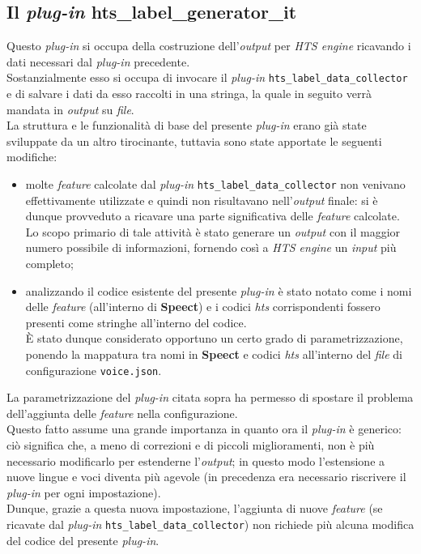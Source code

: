      \subsection{Il \textit{plug-in} hts\_label\_generator\_it}
		 Questo \textit{plug-in} si occupa della costruzione dell'\textit{output} per \textit{HTS engine} ricavando i dati
		 necessari  dal \textit{plug-in} precedente. \\ Sostanzialmente esso si occupa di invocare il \textit{plug-in}
		 \texttt{hts\_label\_data\_collector} e di salvare i dati da esso raccolti in una stringa, la quale 
		 in seguito verrà mandata in \textit{output} su \textit{file}.  \\
		 La struttura e le funzionalità di base del presente \textit{plug-in} erano già state sviluppate
		 da un altro tirocinante, tuttavia sono state apportate le seguenti modifiche:
		 \begin{itemize}		
			\item molte \textit{feature} calcolate dal \textit{plug-in} \texttt{hts\_label\_data\_collector}
			      non venivano effettivamente utilizzate e quindi non risultavano nell'\textit{output}
			      finale: si è dunque provveduto a ricavare una parte significativa delle \textit{feature}
			      calcolate. \\ Lo scopo primario di tale attività è stato generare un \textit{output}
			      con il maggior numero possibile di informazioni, fornendo così a \textit{HTS engine} un \textit{input}
			      più completo;
			\item analizzando il codice esistente del presente \textit{plug-in} è stato notato come i nomi
			      delle \textit{feature} (all'interno di \textbf{Speect}) e i codici \textit{hts} corrispondenti
			      fossero presenti come stringhe all'interno del codice. \\ È stato dunque considerato opportuno
			      un certo grado di parametrizzazione, ponendo la mappatura tra nomi in \textbf{Speect} e codici
			      \textit{hts} all'interno del \textit{file} di configurazione \texttt{voice.json}.
		 \end{itemize} 
                 La parametrizzazione del \textit{plug-in} citata sopra ha permesso di spostare il problema dell'aggiunta delle
                 \textit{feature} nella configurazione. \\ Questo fatto assume una grande importanza in quanto ora il \textit{plug-in} 
                 è generico: ciò significa che, a meno di correzioni e di piccoli miglioramenti, non è più necessario modificarlo
                 per estenderne l'\textit{output}; in questo modo l'estensione a nuove lingue e voci diventa più agevole
                 (in precedenza era necessario riscrivere il \textit{plug-in} per ogni impostazione). \\
                 Dunque, grazie a questa nuova impostazione, l'aggiunta di nuove \textit{feature} (se ricavate dal
                 \textit{plug-in} \texttt{hts\_label\_data\_collector})
                 non richiede più alcuna modifica del codice del presente \textit{plug-in}.


